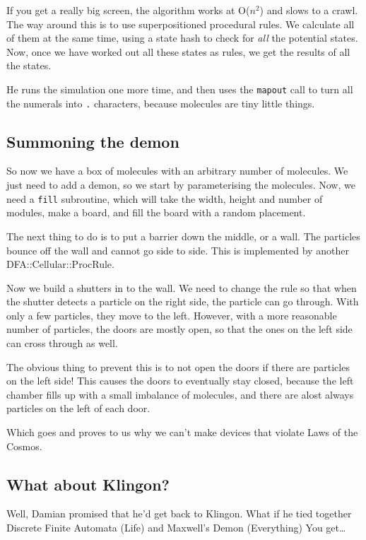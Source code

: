 \documentclass{article}
\begin{document}
If you get a really big screen, the algorithm works at O($n^2$) and
slows to a crawl.  The way around this is to use superpositioned
procedural rules.  We calculate all of them at the same time, using a
state hash to check for \emph{all} the potential states.  Now, once we
have worked out all these states as rules, we get the results of all the
states.

He runs the simulation one more time, and then uses the \verb'mapout'
call to turn all the numerals into \verb'.' characters, because
molecules are tiny little things.

\subsection{Summoning the demon}
So now we have a box of molecules with an arbitrary number of molecules.
We just need to add a demon, so we start by parameterising the molecules.
Now, we need a \verb'fill' subroutine, which will take the 
width, height and number of modules, make a board, and fill the 
board with a random placement.  

The next thing to do is to put a barrier down the middle, or a wall.
The particles bounce off the wall and cannot go side to side.  This is
implemented by another DFA::Cellular::ProcRule.

Now we build a shutters in to the wall.  We need to change the rule so 
that when the shutter detects a particle on the right side, the particle 
can go through.  With only a few particles, they move to the left.  
However, with a more reasonable number of particles, the doors are 
mostly open, so that the ones on the left side can cross through as
well.

The obvious thing to prevent this is to not open the doors if there are
particles on the left side!  This causes the doors
to eventually stay closed, because the left chamber fills up with a
small imbalance of molecules, and there are alost always particles on
the left of each door.

Which goes and proves to us why we can't make devices that violate
Laws of the Cosmos.

\subsection{What about Klingon?}
Well, Damian promised that he'd get back to Klingon.  What if he tied
together Discrete Finite Automata (Life) and Maxwell's Demon (Everything)
You get\ldots
\end{document}

